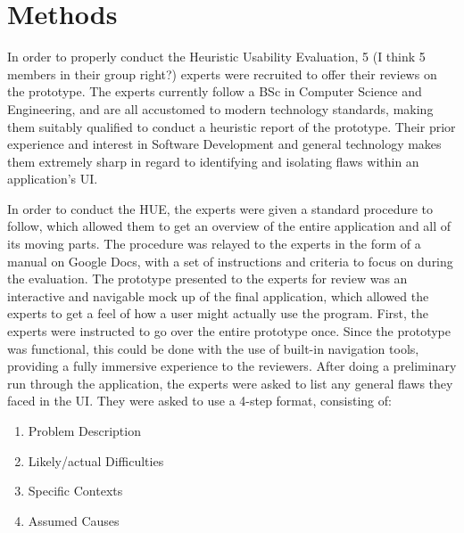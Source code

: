 \section{Methods}

In order to properly conduct the Heuristic Usability Evaluation, 5 (I think 5 members in their group right?) experts were recruited to offer their reviews on the prototype.
The experts currently follow a BSc in Computer Science and Engineering, and are all accustomed to modern technology standards, making them suitably qualified to conduct a heuristic report of the prototype.
Their prior experience and interest in Software Development and general technology makes them extremely sharp in regard to identifying and isolating flaws within an application's UI\@.

In order to conduct the HUE, the experts were given a standard procedure to follow, which allowed them to get an overview of the entire application and all of its moving parts.
The procedure was relayed to the experts in the form of a manual on Google Docs, with a set of instructions and criteria to focus on during the evaluation.
The prototype presented to the experts for review was an interactive and navigable mock up of the final application, which allowed the experts to get a feel of how a user might actually use the program.
First, the experts were instructed to go over the entire prototype once.
Since the prototype was functional, this could be done with the use of built-in navigation tools, providing a fully immersive experience to the reviewers.
After doing a preliminary run through the application, the experts were asked to list any general flaws they faced in the UI. They were asked to use a 4-step format, consisting of:

\begin{enumerate}
    \item Problem Description
    \item Likely/actual Difficulties
    \item Specific Contexts
    \item Assumed Causes
\end{enumerate}

